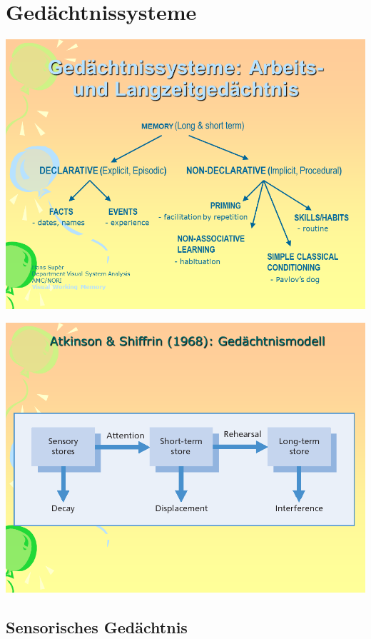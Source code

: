 \documentclass[
  letterpaper,
]{scrbook}
\begin{document}
\hypertarget{geduxe4chtnissysteme}{%
\section{Gedächtnissysteme}\label{geduxe4chtnissysteme}}

\includegraphics[width=1\textwidth,height=\textheight]{./pictures/neuro/Diapozitiv37.PNG}

\includegraphics[width=1\textwidth,height=\textheight]{./pictures/neuro/Diapozitiv38.PNG}

\hypertarget{sensorisches-geduxe4chtnis}{%
\subsection{Sensorisches Gedächtnis}\label{sensorisches-geduxe4chtnis}}
\end{document}
